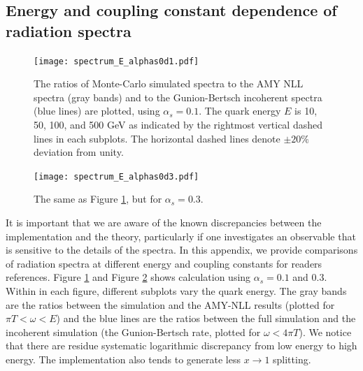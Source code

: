 \documentclass[aps, prc, reprint, amsmath, groupedaddress, nofootinbib]{revtex4-1}
\begin{document}
\begin{appendices}
\section{Energy and coupling constant dependence of radiation spectra}\label{app:tune-spectrum}
\begin{figure}
\texttt{[image: spectrum\_E\_alphas0d1.pdf]}
\caption{The ratios of Monte-Carlo simulated spectra to the AMY NLL spectra (gray bands) and to the Gunion-Bertsch incoherent spectra (blue lines) are plotted, using $\alpha_s = 0.1$. The quark energy $E$ is 10, 50, 100, and 500 GeV as indicated by the rightmost vertical dashed lines in each subplots. The horizontal dashed lines denote $\pm 20\%$ deviation from unity.}
\label{fig:spectra-alphas=0.1}
\end{figure}

\begin{figure}
\texttt{[image: spectrum\_E\_alphas0d3.pdf]}
\caption{The same as Figure \ref{fig:spectra-alphas=0.1}, but for $\alpha_s = 0.3$.}
\label{fig:spectra-alphas=0.3}
\end{figure}
\end{appendices}

It is important that we are aware of the known discrepancies between the implementation and the theory, particularly if one investigates an observable that is sensitive to the details of the spectra. 
In this appendix, we provide comparisons of radiation spectra at different energy and coupling constants for readers references.
Figure \ref{fig:spectra-alphas=0.1} and Figure \ref{fig:spectra-alphas=0.3} shows calculation using $\alpha_s = 0.1$ and $0.3$.
Within in each figure, different subplots vary the quark energy.
The gray bands are the ratios between the simulation and the AMY-NLL results (plotted for $\pi T < \omega < E$) and the blue lines are the ratios between the full simulation and the incoherent simulation (the Gunion-Bertsch rate, plotted for $\omega < 4\pi T $).
We notice that there are residue systematic logarithmic discrepancy from low energy to high energy.
The implementation also tends to generate less $x \rightarrow 1$ splitting.


 
\end{document}
